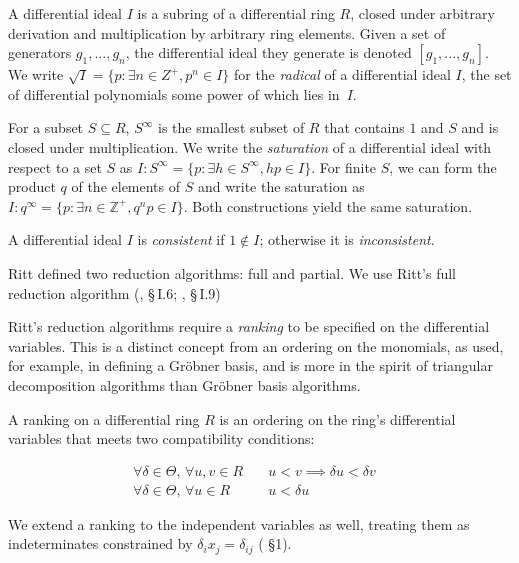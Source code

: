 \documentclass{article}
\theoremstyle{definition}
\theoremstyle{plain}
\begin{document}
A differential ideal $I$ is a subring of a differential ring $R$, closed under arbitrary
derivation and multiplication by arbitrary ring elements.  Given a set of generators $g_1,...,g_n$,
the differential ideal they generate is denoted $[g_1,...,g_n]$.
We write $\sqrt{I} = \{p:\exists n\in Z^+, p^n \in I\}$ for the {\it radical} of a differential ideal $I$, the set of
differential polynomials some power of which lies in~$I$.

For a subset $S \subseteq R$, $S^\infty$ is the smallest subset of $R$ that contains $1$ and $S$ and
is closed under multiplication.
We write the {\it saturation} of a differential ideal with respect to a set $S$
as $I:S^\infty = \{p: \exists h \in S^\infty, hp\in I\}$.
For finite $S$, we can form the product $q$ of the elements of $S$ and write the saturation
as $I:q^\infty = \{p: \exists n \in \mathbb{Z}^{+}, q^np \in I\}$.  Both constructions
yield the same saturation.

A differential ideal $I$ is {\it consistent} if $1 \notin I$; otherwise it is {\it inconsistent}.

Ritt defined two reduction algorithms: full and partial.
We use Ritt's full reduction algorithm
(\cite{Ritt}, \S\,I.6; \cite{Kolchin}, \S\,I.9)


Ritt's reduction algorithms require a {\it ranking} to be specified on the differential variables.
This is a distinct concept from an ordering on the monomials, as used, for example, in defining a Gr\"obner basis,
and is more in the spirit of triangular decomposition algorithms than Gr\"obner basis algorithms.

A ranking on a differential ring $R$ is an ordering on the ring's differential variables that meets two compatibility conditions:

\begin{equation}
\begin{aligned}
\label{ranking compatibility}
\forall \delta\in\Theta, \, \forall u,v \in R & \quad u < v \implies \delta u < \delta v & \\
\forall \delta\in\Theta, \, \forall u \in R & \quad u < \delta u
\end{aligned}
\end{equation}

We extend a ranking to the independent variables as well, treating them as indeterminates constrained by $\delta_i x_j = \delta_{ij}$ 
(\cite{Boulier-Lemaire} \S1).
\end{document}
